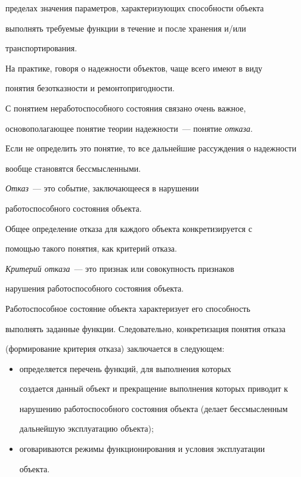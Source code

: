 пределах значения параметров, характеризующих способности объекта 


выполнять тре\-бу\-емые функции в течение и после хранения и/или 


транспортирования.


     


     На практике, говоря о надежности объектов, чаще всего имеют в виду 


понятия безотказности и ремонтопригодности.


     


     С понятием неработоспособного состояния связано очень важное, 


основополагающее понятие теории надежности~--- понятие \textit{отказа}. 


Если не определить это понятие, то все дальнейшие рассуждения о надежности 


вообще становятся бессмысленными.


     


     \textit{Отказ}~--- это событие, заключающееся в нарушении 


работоспособного состояния объекта.


     


     Общее определение отказа для каждого объекта конкретизируется с 


помощью такого понятия, как критерий отказа.


     


     \textit{Критерий отказа}~--- это признак или совокупность признаков 


нарушения работоспособного состояния объекта.


     


     Работоспособное состояние объекта характеризует его способность 


выполнять заданные функции. Следовательно, конкретизация понятия отказа 


(формирование критерия отказа) заключается в следующем:


     \begin{itemize}


     \item  определяется перечень функций, для выполнения которых 


создается данный объект и прекращение выполнения которых приводит к 


нарушению работоспособного состояния объекта (делает бессмысленным 


дальнейшую эксплуатацию объекта); 


     \item  оговариваются режимы функционирования и условия эксплуатации 


объекта.


     \end{itemize}


